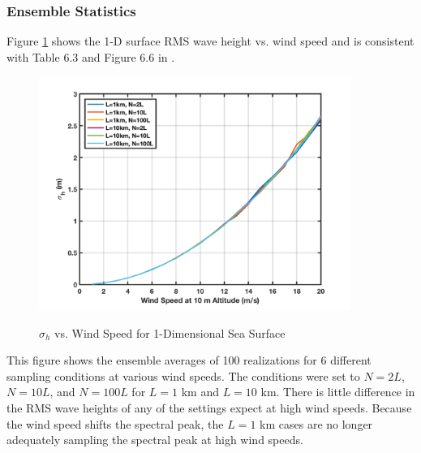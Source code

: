 \subsubsection{Ensemble Statistics}
Figure \ref{os_fig:7fff} shows the 1-D surface RMS wave height vs. wind speed and is consistent with Table 6.3 and Figure 6.6 in \cite{temper_guide}.
\begin{figure}[H]
  \begin{center}
\includegraphics[width=4in]{../media/Ocean_Surface/1d_ensemble_rms.png}
  \end{center}
  \renewcommand{\baselinestretch}{1} \small\normalsize
  \begin{quote}
    \caption[$\sigma_h$ vs. Wind Speed for 1-Dimensional Sea Surface]{$\sigma_h$ vs. Wind Speed for 1-Dimensional Sea Surface\label{os_fig:7fff}}
  \end{quote}
\end{figure}
\renewcommand{\baselinestretch}{2} \small\normalsize
This figure shows the ensemble averages of 100 realizations for 6 different sampling conditions at various wind speeds. The conditions were set to $N = 2L$, $N = 10L$, and $N = 100L$ for $L = 1$ km and $L = 10$ km. There is little difference in the RMS wave heights of any of the settings expect at high wind speeds. Because the wind speed shifts the spectral peak, the $L = 1$ km cases are no longer adequately sampling the spectral peak at high wind speeds.

